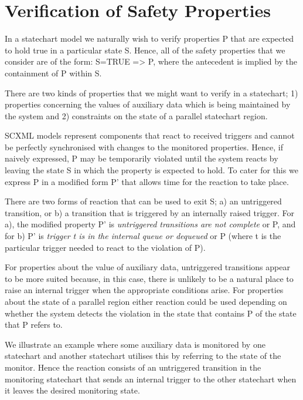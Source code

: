 

\section{Verification of Safety Properties}

In a statechart model we naturally wish to verify properties P that are expected to hold true in a particular state S.
Hence, all of the safety properties that we consider are of the form: S=TRUE => P, where the antecedent is implied by the containment of P within S.

There are two kinds of properties that we might want to verify in a statechart;
1) properties concerning the values of auxiliary data which is being maintained by the system and 2) constraints on the state of a parallel statechart region.

SCXML models represent components that react to received triggers and cannot be perfectly synchronised with changes to the monitored properties. 
Hence, if naively expressed, P may be temporarily violated until the system reacts by leaving the state S in which the property is expected to hold.
To cater for this we express P in a modified form P' that allows time for the reaction to take place.

There are two forms of reaction that can be used to exit S; a) an untriggered transition, or b) a transition that is triggered by an internally raised trigger.
For a), the modified property P' is \emph{untriggered transitions are not complete} or P, and for b) P' is \emph{trigger t is in the internal queue or dequeued} or P (where t is the particular trigger needed to react to the violation of P).

For properties about the value of auxiliary data, untriggered transitions appear to be more suited because, in this case, there is unlikely to be a natural place to raise an internal trigger when the appropriate conditions arise.
For properties about the state of a parallel region either reaction could be used depending on whether the system detects the violation in the state that contains P of the state that P refers to.

We illustrate an example where some auxiliary data is monitored by one statechart  and another statechart utilises this by referring to the state of the monitor. 
Hence the reaction consists of an untriggered transition in the monitoring statechart that sends an internal trigger to the other statechart when it leaves the desired monitoring state.







